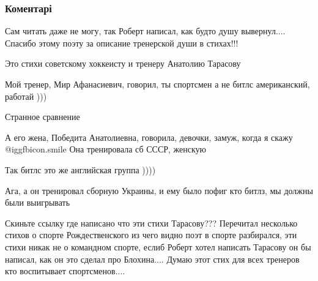  
 
 
 
 
\subsubsection{Коментарі}

\begin{itemize} %
Сам читать даже не могу, так Роберт написал, как будто душу вывернул.... Спасибо этому поэту за описание тренерской души в стихах!!!

Это стихи советскому хоккеисту и тренеру Анатолию Тарасову

Мой тренер, Мир Афанасиевич, говорил, ты спортсмен а не битлс американский, работай )))

\begin{itemize} %
Странное сравнение

А его жена, Победита Анатолиевна, говорила, девочки, замуж, когда я скажу  @igg{fbicon.smile} 
Она тренировала сб СССР, женскую
\end{itemize} %

Так битлс это же английская группа ))))

\begin{itemize} %
Ага, а он тренировал сборную Украины, и ему было пофиг кто битлз, мы должны были выигрывать
\end{itemize} %


Скиньте ссылку где написано что эти стихи Тарасову??? Перечитал несколько
стихов о спорте Рождественского из чего видно поэт в спорте разбирался, эти
стихи никак не о командном спорте, еслиб Роберт хотел написать Тарасову он бы
написал, как он это сделал про Блохина.... Думаю этот стих для всех тренеров
кто воспитывает спортсменов....

\end{itemize} %
